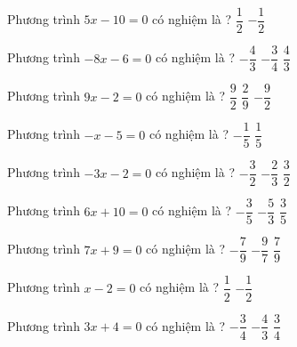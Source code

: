 \begin{ex} 
 Phương trình $5x-10=0$ có nghiệm là ? 
 {$ \dfrac{ 1 }{ 2 } $} 
 {} 
 {$- \dfrac{ 1 }{ 2 } $}  
 \loigiai{} 
 \end{ex} 
 
\begin{ex} 
 Phương trình $-8x-6=0$ có nghiệm là ? 
 {$- \dfrac{ 4 }{ 3 } $} 
 {\True $- \dfrac{ 3 }{ 4 } $} 
 {$ \dfrac{ 4 }{ 3 } $}  
 \loigiai{} 
 \end{ex} 
 
\begin{ex} 
 Phương trình $9x-2=0$ có nghiệm là ? 
 {$ \dfrac{ 9 }{ 2 } $} 
 {\True $ \dfrac{ 2 }{ 9 } $} 
 {$- \dfrac{ 9 }{ 2 } $}  
 \loigiai{} 
 \end{ex} 
 
\begin{ex} 
 Phương trình $-x-5=0$ có nghiệm là ? 
 {$- \dfrac{ 1 }{ 5 } $} 
 {} 
 {$ \dfrac{ 1 }{ 5 } $}  
 \loigiai{} 
 \end{ex} 
 
\begin{ex} 
 Phương trình $-3x-2=0$ có nghiệm là ? 
 {$- \dfrac{ 3 }{ 2 } $} 
 {\True $- \dfrac{ 2 }{ 3 } $} 
 {$ \dfrac{ 3 }{ 2 } $}  
 \loigiai{} 
 \end{ex} 
 
\begin{ex} 
 Phương trình $6x+10=0$ có nghiệm là ? 
 {$- \dfrac{ 3 }{ 5 } $} 
 {\True $- \dfrac{ 5 }{ 3 } $} 
 {$ \dfrac{ 3 }{ 5 } $}  
 \loigiai{} 
 \end{ex} 
 
\begin{ex} 
 Phương trình $7x+9=0$ có nghiệm là ? 
 {$- \dfrac{ 7 }{ 9 } $} 
 {\True $- \dfrac{ 9 }{ 7 } $} 
 {$ \dfrac{ 7 }{ 9 } $}  
 \loigiai{} 
 \end{ex} 
 
\begin{ex} 
 Phương trình $x-2=0$ có nghiệm là ? 
 {$ \dfrac{ 1 }{ 2 } $} 
 {} 
 {$- \dfrac{ 1 }{ 2 } $}  
 \loigiai{} 
 \end{ex} 
 
\begin{ex} 
 Phương trình $3x+4=0$ có nghiệm là ? 
 {$- \dfrac{ 3 }{ 4 } $} 
 {\True $- \dfrac{ 4 }{ 3 } $} 
 {$ \dfrac{ 3 }{ 4 } $}  
 \loigiai{} 
 \end{ex} 
 
